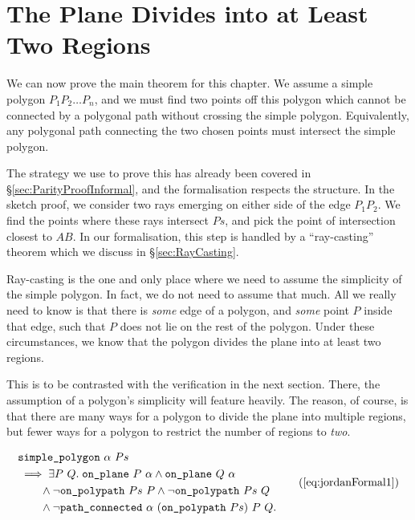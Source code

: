 \section{The Plane Divides into at Least Two Regions}\label{sec:FinalProofJordan1}
We can now prove the main theorem for this chapter. We assume a simple polygon $P_1P_2\ldots P_n$, and we must find two points off this polygon which cannot be connected by a polygonal path without crossing the simple polygon. Equivalently, any polygonal path connecting the two chosen points must intersect the simple polygon.

The strategy we use to prove this has already been covered in \S\ref{sec:ParityProofInformal}, and the formalisation respects the structure. In the sketch proof, we consider two rays emerging on either side of the edge $P_1P_2$. We find the points where these rays intersect $Ps$, and pick the point of intersection closest to $AB$. In our formalisation, this step is handled by a ``ray-casting'' theorem which we discuss in \S\ref{sec:RayCasting}. 

Ray-casting is the one and only place where we need to assume the simplicity of the simple polygon. In fact, we do not need to assume that much. All we really need to know is that there is \emph{some} edge of a polygon, and \emph{some} point $P$ inside that edge, such that $P$ does not lie on the rest of the polygon. Under these circumstances, we know that the polygon divides the plane into at least two regions.

This is to be contrasted with the verification in the next section. There, the assumption of a polygon's simplicity will feature heavily. The reason, of course, is that there are many ways for a polygon to divide the plane into multiple regions, but fewer ways for a polygon to restrict the number of regions to \emph{two}.

\begin{equation}
  \begin{split}
    &\code{simple\_polygon}\ \alpha\ Ps\\
    &\implies \exists P\ Q.\; \code{on\_plane}\ P\ \alpha \wedge \code{on\_plane}\ Q\ \alpha\\
    &\qquad\wedge \neg\code{on\_polypath}\ Ps\ P \wedge \neg\code{on\_polypath}\ Ps\ Q\\
    &\qquad\wedge \neg\code{path\_connected}\ \alpha\ (\code{on\_polypath}\ Ps)\ P\ Q.
  \end{split}\tag{\ref{eq:jordanFormal1}}
\end{equation}

